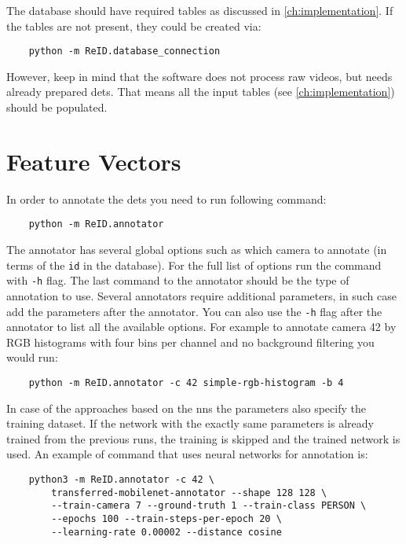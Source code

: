 The database should have required tables as discussed in \autoref{ch:implementation}. If the tables are not present, they could be created via:

\begin{verbatim}
    python -m ReID.database_connection
\end{verbatim}

However, keep in mind that the software does not process raw videos, but needs already prepared \glspl{det}. That means all the input tables (see \autoref{ch:implementation}) should be populated.

\section{Feature Vectors}

In order to annotate the \glspl{det} you need to run following command:

\begin{verbatim}
    python -m ReID.annotator
\end{verbatim}

The annotator has several global options such as which camera to annotate (in terms of the \verb+id+ in the database). For the full list of options run the command with \verb+-h+ flag. The last command to the annotator should be the type of annotation to use. Several annotators require additional parameters, in such case add the parameters after the annotator. You can also use the \verb+-h+ flag after the annotator to list all the available options. For example to annotate camera 42 by RGB histograms with four bins per channel and no background filtering you would run:

\begin{verbatim}
    python -m ReID.annotator -c 42 simple-rgb-histogram -b 4
\end{verbatim}

In case of the approaches based on the \glspl{nn} the parameters also specify the training dataset. If the network with the exactly same parameters is already trained from the previous runs, the training is skipped and the trained network is used. An example of command that uses neural networks for annotation is:

\begin{verbatim}
    python3 -m ReID.annotator -c 42 \
        transferred-mobilenet-annotator --shape 128 128 \
        --train-camera 7 --ground-truth 1 --train-class PERSON \
        --epochs 100 --train-steps-per-epoch 20 \
        --learning-rate 0.00002 --distance cosine
\end{verbatim}

